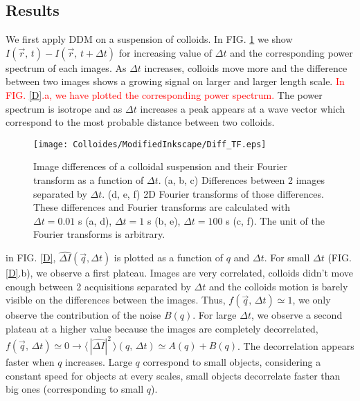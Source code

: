 \documentclass[%
 aip,
 jmp,%
 amsmath,amssymb,
reprint,%
]{revtex4-1}
\begin{document}
\label{AlgoTable}


\subsection{Results}

We first apply DDM on a suspension of colloids. In FIG. \ref{DifferenceAndFFT} we show $I(\vec{r}, \, t)- I(\vec{r}, \, t+\Delta t)$ for increasing value of $\Delta t$ and the corresponding power spectrum of each images. As $\Delta t$ increases, colloids move more and the difference between two images shows a growing signal on larger and larger length scale. \textcolor{red}{In FIG. \ref{D}.a, we have plotted the corresponding power spectrum.} The power spectrum is isotrope and as $\Delta t$ increases a peak appears at a wave vector which correspond to the most probable distance between two colloids. 

\begin{figure}[H]
\centering
\texttt{[image: Colloides/ModifiedInkscape/Diff\_TF.eps]}
\caption{Image differences of a colloidal suspension and their Fourier transform as a function of $\Delta t$. (a, b, c) Differences between 2 images separated by $\Delta t$. (d, e, f) 2D Fourier transforms of those differences. These differences and Fourier transforms are calculated with $\Delta t = 0.01$ s (a, d), $\Delta t = 1$ s (b, e), $\Delta t = 100$ s (c, f). The unit of the Fourier transforms is arbitrary.}
\label{DifferenceAndFFT}
\end{figure}


in FIG. \ref{D}, $\widehat{\Delta I}(\vec{q}, \Delta t)$ is plotted as a function of $q$ and $\Delta t$. For small $\Delta t$ (FIG. \ref{D}.b), we observe a first plateau. Images are very correlated, colloids didn't move enough between 2 acquisitions separated by $\Delta t$ and the colloids motion is barely visible on the differences between the images. Thus, $f(\vec{q}, \, \Delta t) \simeq 1$,  we only observe the contribution of the noise $B(q)$. For large $\Delta t$, we observe a second plateau at a higher value because the images are completely decorrelated, $f(\vec{q}, \, \Delta t) \simeq 0 \rightarrow \langle \, |\widehat{\Delta I}|^2 \, \rangle (q, \, \Delta t) \simeq A(q)+B(q)$. The decorrelation appears faster when $q$ increases. Large $q$ correspond to small objects, considering a constant speed for objects at every scales, small objects decorrelate faster than big ones (corresponding to small $q$).
\end{document}
